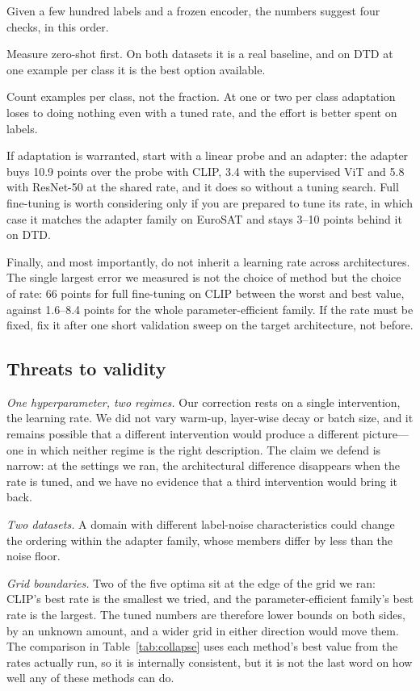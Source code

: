 \documentclass[preprint,12pt]{elsarticle}
\begin{document}
Given a few hundred labels and a frozen encoder, the numbers suggest four checks,
in this order.

Measure zero-shot first. On both datasets it is a real baseline, and on DTD at one
example per class it is the best option available.

Count examples per class, not the fraction. At one or two per class adaptation
loses to doing nothing even with a tuned rate, and the effort is better spent on
labels.

If adaptation is warranted, start with a linear probe and an adapter: the adapter
buys 10.9 points over the probe with CLIP, 3.4 with the supervised ViT and 5.8
with ResNet-50 at the shared rate, and it does so without a tuning search. Full
fine-tuning is worth considering only if you are prepared to tune its rate, in
which case it matches the adapter family on EuroSAT and stays 3--10 points behind
it on DTD.

Finally, and most importantly, do not inherit a learning rate across
architectures. The single largest error we measured is not the choice of method
but the choice of rate: 66 points for full fine-tuning on CLIP between the worst
and best value, against 1.6--8.4 points for the whole parameter-efficient family.
If the rate must be fixed, fix it after one short validation sweep on the target
architecture, not before.

\subsection{Threats to validity}
\label{sec:threats}

\emph{One hyperparameter, two regimes.} Our correction rests on a single
intervention, the learning rate. We did not vary warm-up, layer-wise decay or
batch size, and it remains possible that a different intervention would produce a
different picture---one in which neither regime is the right description. The
claim we defend is narrow: at the settings we ran, the architectural difference
disappears when the rate is tuned, and we have no evidence that a third
intervention would bring it back.

\emph{Two datasets.} A domain with different label-noise characteristics could
change the ordering within the adapter family, whose members differ by less than
the noise floor.

\emph{Grid boundaries.} Two of the five optima sit at the edge of the grid we ran:
CLIP's best rate is the smallest we tried, and the parameter-efficient family's
best rate is the largest. The tuned numbers are therefore lower bounds on both
sides, by an unknown amount, and a wider grid in either direction would move them.
The comparison in Table~\ref{tab:collapse} uses each method's best value from the
rates actually run, so it is internally consistent, but it is not the last word on
how well any of these methods can do.
\end{document}
